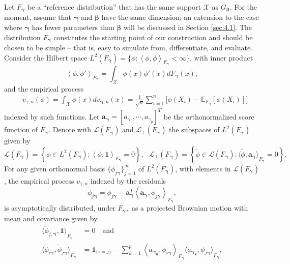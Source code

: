 \documentclass[11pt]{article}
\newcommand{\vect}[1]{\boldsymbol{#1}}
\newcommand{\inner}[1]{\left\langle #1 \right\rangle}
\begin{document}
Let $F_{\vect{\gamma}}$ be a ``reference distribution''  %
that has the same support $\mathcal{X}$ as $G_{\vect{\beta}}$. 
For the moment, assume that $\vect{\gamma}$ and $\vect{\beta}$ have the same dimension; an extension to the case where $\vect{\gamma}$ has fewer parameters than $\vect{\beta}$ will be discussed in Section \ref{sec:4.1}. The distribution $F_{\vect{\gamma}}$ constitutes the starting point of our construction and should be chosen to be simple -- that is, easy to simulate from, differentiate, and evaluate. 
Consider the Hilbert space $L^2(F_{\vect{\gamma}}) = \{ \phi: \inner{\phi,\phi}_{F_{\vect{\gamma}}}<\infty\}$,
with inner product
$$\inner{\phi,\phi'}_{F_{\vect{\gamma}}} = \int_{\mathcal{X}}\phi(x)\phi'(x)dF_{\vect{\gamma}}(x),$$
and the empirical process 
\begin{equation*}
    \begin{aligned}
    &v_{\gamma,n}(\phi) = \int_{\mathcal{X}}\phi(x)dv_{\vect{\gamma},n}(x) = 
    \frac{1}{\sqrt{n}}\sum_{i=1}^n \bigl[\phi (X_i)- \mathbb{E}_{F_{\vect{{\gamma}}}}[\phi (X_i)]
\bigl]
    \label{eqn:vF}
    \end{aligned}
    \end{equation*}
indexed by such functions. Let $\vect{a}_{\vect{\gamma}}=[a_{\gamma_1},\cdots, a_{{\gamma_p}}]^T$ be the orthonormalized score function of $F_{\vect{\gamma}}$. Denote with  
$\mathcal{L}\left(F_{\vect{\gamma}}\right)$ and $\mathcal{L}_{\perp}\left(F_{\vect{\gamma}}\right)$ the subspaces of $L^2\left(F_{\vect{\gamma}}\right)$ given by
$$\mathcal{L}\left(F_{\vect{\gamma}}\right)=\left\{ \phi \in L^2\left(F_{\vect{\gamma}}\right): \inner{\phi,\bm{1}}_{F_{\vect{\gamma}}}=0\right\}, \ \ \
\mathcal{L}_{\perp}\left(F_{\vect{\gamma}}\right)=\left\{ \widetilde{\phi} \in \mathcal{L}\left(F_{\vect{\gamma}}\right): \bigl\langle{\widetilde{\phi},\vect{a}_{\vect{\gamma}}\bigl\rangle}_{F_{\vect{\gamma}}}=0\right\}.$$
For any given orthonormal basis $\{\phi_{j\vect{\gamma}}\}_{j=1}^{\infty}$ of $L^2(F_{\vect{\gamma}})$, with elements in $\mathcal{L}(F_{\vect{\gamma}})$, the empirical process $v_{\gamma,n}$ indexed by the residuals
$$\widetilde{\phi}_{j\vect{\gamma}} = \phi_{j\vect{\gamma}} -\vect{a}^T_{\vect{\gamma}}\left\langle \vect{a}_{\vect{\gamma}},\phi_{j\vect{\gamma}}\right\rangle_{F_{\vect{\gamma}}}, $$
is asymptotically distributed, under $F_{\vect{\gamma}},$ as a projected Brownian motion with mean and covariance given by
\begin{align*}
\bigl\langle{\widetilde{\phi}_{j,\vect{\gamma}},\vect{1}\bigl\rangle}_{F_{\vect{\gamma}}}&=0\quad\text{and}\\
\bigl\langle{\widetilde{\phi}_{i\vect{\gamma}},\widetilde{\phi}_{j\vect{\gamma}}\bigl\rangle}_{F_{\vect{\gamma}}} &= \mathds{1}_{\{i=j\}}-\sum_{k=1}^p \inner{a_{\vect{\gamma_k}},\phi_{i\vect{\gamma}}}_{F_{\vect{\gamma}}}\bigl\langle{a_{\vect{\gamma_k}},\phi_{j\vect{\gamma}}\bigl\rangle}_{F_{\vect{\gamma}}},
\end{align*}
\end{document}
